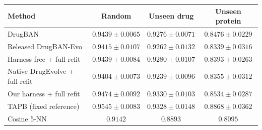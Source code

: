 \begin{tabular}{lccc}
\toprule
Method & Random & Unseen drug & Unseen protein \\
\midrule
DrugBAN & $0.9439 \pm 0.0065$ & $0.9276 \pm 0.0071$ & $0.8476 \pm 0.0229$ \\
Released DrugBAN-Evo & $0.9415 \pm 0.0107$ & $0.9262 \pm 0.0132$ & $0.8339 \pm 0.0316$ \\
Harness-free + full refit & $0.9439 \pm 0.0084$ & $0.9280 \pm 0.0107$ & $0.8393 \pm 0.0263$ \\
Native DrugEvolve + full refit & $0.9404 \pm 0.0073$ & $0.9239 \pm 0.0096$ & $0.8355 \pm 0.0312$ \\
Our harness + full refit & $0.9474 \pm 0.0092$ & $0.9330 \pm 0.0103$ & $0.8534 \pm 0.0287$ \\
TAPB (fixed reference) & $0.9545 \pm 0.0083$ & $0.9328 \pm 0.0148$ & $0.8868 \pm 0.0362$ \\
Cosine 5-NN & $0.9142$ & $0.8893$ & $0.8095$ \\
\bottomrule
\end{tabular}
